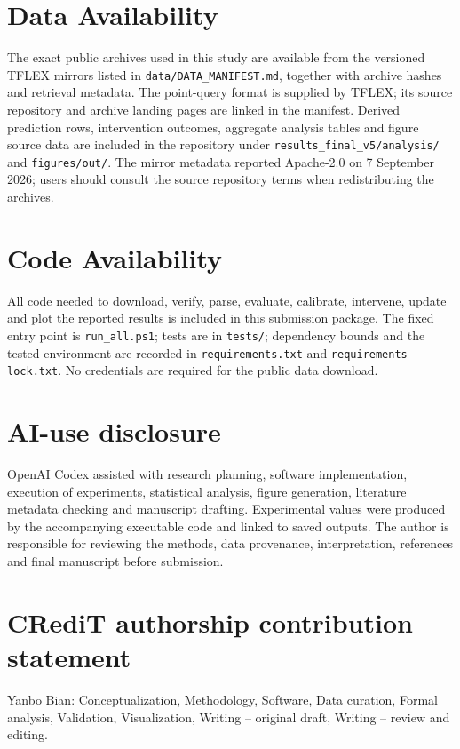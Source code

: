 \documentclass[preprint,12pt]{elsarticle}
\begin{document}
\section{Data Availability}
The exact public archives used in this study are available from the versioned TFLEX mirrors listed in \texttt{data/DATA\_MANIFEST.md}, together with archive hashes and retrieval metadata. The point-query format is supplied by TFLEX; its source repository and archive landing pages are linked in the manifest. Derived prediction rows, intervention outcomes, aggregate analysis tables and figure source data are included in the repository under \texttt{results\_final\_v5/analysis/} and \texttt{figures/out/}. The mirror metadata reported Apache-2.0 on 7 September 2026; users should consult the source repository terms when redistributing the archives.

\section{Code Availability}
All code needed to download, verify, parse, evaluate, calibrate, intervene, update and plot the reported results is included in this submission package. The fixed entry point is \texttt{run\_all.ps1}; tests are in \texttt{tests/}; dependency bounds and the tested environment are recorded in \texttt{requirements.txt} and \texttt{requirements-lock.txt}. No credentials are required for the public data download.

\section{AI-use disclosure}
OpenAI Codex assisted with research planning, software implementation, execution of experiments, statistical analysis, figure generation, literature metadata checking and manuscript drafting. Experimental values were produced by the accompanying executable code and linked to saved outputs. The author is responsible for reviewing the methods, data provenance, interpretation, references and final manuscript before submission.

\section*{CRediT authorship contribution statement}
Yanbo Bian: Conceptualization, Methodology, Software, Data curation, Formal analysis, Validation, Visualization, Writing -- original draft, Writing -- review and editing.
\end{document}

